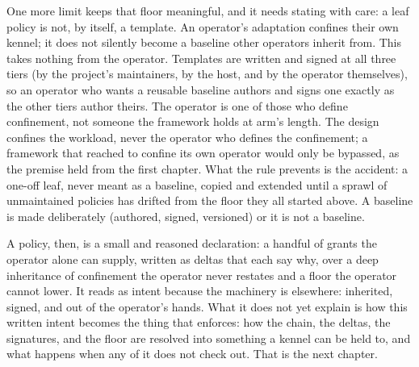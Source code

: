 One more limit keeps that floor meaningful, and it needs stating with
care: a leaf policy is not, by itself, a template. An operator's
adaptation confines their own kennel; it does not silently become a
baseline other operators inherit from. This takes nothing from the
operator. Templates are written and signed at all three tiers (by the
project's maintainers, by the host, and by the operator themselves), so
an operator who wants a reusable baseline authors and signs one exactly
as the other tiers author theirs. The operator is one of those who
define confinement, not someone the framework holds at arm's length. The
design confines the workload, never the operator who defines the
confinement; a framework that reached to confine its own operator would
only be bypassed, as the premise held from the first chapter. What the
rule prevents is the accident: a one-off leaf, never meant as a
baseline, copied and extended until a sprawl of unmaintained policies
has drifted from the floor they all started above. A baseline is made
deliberately (authored, signed, versioned) or it is not a baseline.

A policy, then, is a small and reasoned declaration: a handful of grants
the operator alone can supply, written as deltas that each say why, over
a deep inheritance of confinement the operator never restates and a
floor the operator cannot lower. It reads as intent because the
machinery is elsewhere: inherited, signed, and out of the operator's
hands. What it does not yet explain is how this written intent becomes
the thing that enforces: how the chain, the deltas, the signatures, and
the floor are resolved into something a kennel can be held to, and what
happens when any of it does not check out. That is the next chapter.
